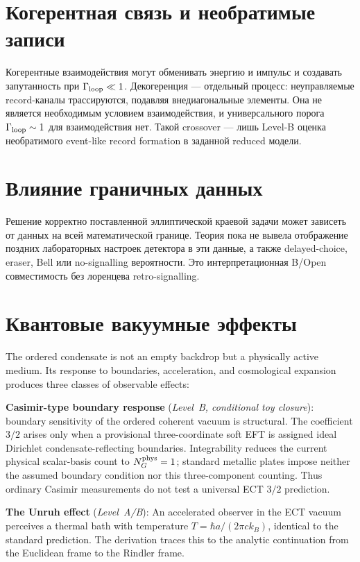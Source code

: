 \documentclass[11pt,a4paper]{article}
\begin{document}
\section{Когерентная связь и необратимые записи}

Когерентные взаимодействия могут обменивать энергию и импульс и создавать
запутанность при $\Gamma_{\rm loop}\ll1$. Декогеренция — отдельный процесс:
неуправляемые record-каналы трассируются, подавляя внедиагональные элементы.
Она не является необходимым условием взаимодействия, и универсального порога
$\Gamma_{\rm loop}\sim1$ для взаимодействия нет. Такой crossover — лишь
Level-B оценка необратимого event-like record formation в заданной reduced
модели.

\section{Влияние граничных данных}
\label{sec:pop_future}

Решение корректно поставленной эллиптической краевой задачи может зависеть от
данных на всей математической границе. Теория пока не вывела отображение
поздних лабораторных настроек детектора в эти данные, а также delayed-choice,
eraser, Bell или no-signalling вероятности. Это интерпретационная B/Open
совместимость без лоренцева retro-signalling.

\section{Квантовые вакуумные эффекты}

The ordered condensate is not an empty backdrop but a physically active medium. Its response to boundaries, acceleration, and cosmological expansion produces three classes of observable effects:

\textbf{Casimir-type boundary response} (\emph{Level~B, conditional toy closure}): boundary sensitivity of the ordered coherent vacuum is structural.  The coefficient $3/2$ arises only when a provisional three-coordinate soft EFT is assigned ideal Dirichlet condensate-reflecting boundaries.  Integrability reduces the current physical scalar-basis count to $N_G^{\rm phys}=1$; standard metallic plates impose neither the assumed boundary condition nor this three-component counting.  Thus ordinary Casimir measurements do not test a universal ECT $3/2$ prediction.

\textbf{The Unruh effect} (\emph{Level~A/B}): An accelerated observer in the ECT vacuum perceives a thermal bath with temperature $T = \hbar a/(2\pi c k_B)$, identical to the standard prediction. The derivation traces this to the analytic continuation from the Euclidean frame to the Rindler frame.
\end{document}

